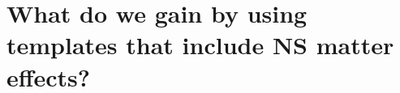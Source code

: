 \documentclass[aps,prd,amsmath,floats,floatfix, twocolumn,
superscriptaddress,nofootinbib,showpacs]{revtex4-1}
\begin{document}
\hspace{5mm}






\section{What do we gain by using templates that include NS matter effects?}
% 
\end{document}
